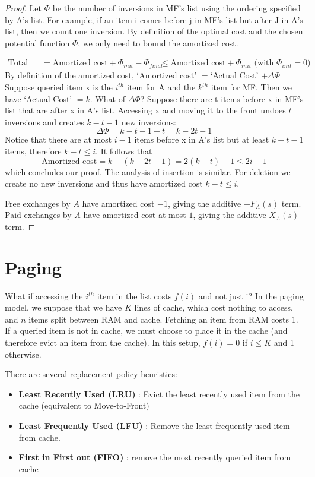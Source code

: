 \documentclass[11pt]{article}
\begin{document}
\begin{proof}
Let $\Phi$ be the number of inversions in MF's list using the ordering specified by A's list. For example, if an item i comes before j in MF's list but after J in A's list, then we count one inversion. By definition of the optimal cost and the chosen potential function $\Phi$, we only need to bound the amortized cost.

\begin{align}
\text{Total cost} &= \text{Amortized cost} + \Phi_{init} - \Phi_{final} \nonumber
&\leq \text{Amortized cost} + \Phi_{init} \text{ (with }\Phi_{init} =0) \nonumber
\end{align}
By definition of the amortized cost, `Amortized cost' $= $`Actual Cost'  $+ \Delta \Phi$
Suppose queried item x is the $i^{th}$ item for A and the $k^{th}$ item for MF. Then we have `Actual Cost' $= k $. What of $\Delta \Phi$? Suppose there are t items before x in MF's list that are after x in A's list. Accessing x and moving it to the front undoes $t$ inversions and creates $k - t -1$ new inversions:
$$\Delta \Phi = k - t - 1 - t = k - 2t - 1$$
Notice that there are at most $i -1$ items before x in A's list but at least $k - t -1$ items, therefore $k -t \leq i$. It follows that $$\text{Amortized cost} = k + (k - 2t - 1) =2 (k - t) -1 \leq 2 i -1$$ which concludes our proof. The analysis of insertion is similar. For deletion we create no new inversions and thus have amortized cost $k-t \le i$.

Free exchanges by $A$ have amortized cost $-1$, giving the additive $-F_A(s)$ term. Paid exchanges by $A$ have amortized cost at most $1$, giving the additive $X_A(s)$ term.
\end{proof}

\section{Paging}

What if accessing the $i^{th}$ item in the list costs $f(i)$ and not just i? In the paging model, we suppose that we have $K$ lines of cache, which cost nothing to access, and $n$ items split between RAM and cache. Fetching an item from RAM costs 1. If a queried item is not in cache, we must choose to place it in the cache (and therefore evict an item from the cache). In this setup, $f(i) = 0$ if $i \leq K$ and 1 otherwise. 

There are several replacement policy heuristics:

\begin{itemize}
\item {\bf Least Recently Used (LRU)} : Evict the least recently used item from the cache (equivalent to Move-to-Front)
\item {\bf Least Frequently Used (LFU)} : Remove the least frequently used item from cache.
\item {\bf First in First out (FIFO)} : remove the most recently queried item from cache
\end{itemize}
\end{document}
